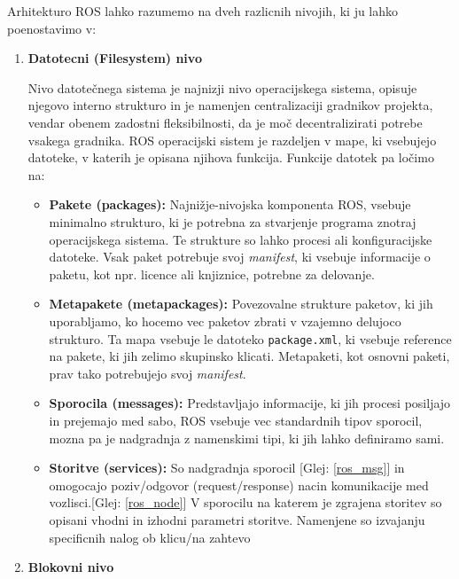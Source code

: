 \documentclass[a4paper,twoside,openright,12pt,slovene]{book}
\begin{document}
Arhitekturo ROS \cite{ROS_arhitektura} lahko razumemo na dveh razlicnih nivojih, ki ju lahko poenostavimo v:
\begin{enumerate}
    \item  \label{file_lvl} \textbf{Datotecni (Filesystem) nivo} 
    
    Nivo datotečnega sistema je najnizji nivo operacijskega sistema, opisuje njegovo interno strukturo in je namenjen centralizaciji gradnikov projekta, vendar obenem zadostni fleksibilnosti, da je moč decentralizirati potrebe vsakega gradnika. ROS operacijski sistem je razdeljen v mape, ki vsebujejo datoteke, v katerih je opisana njihova funkcija. Funkcije datotek pa ločimo na:
        \begin{itemize}
            \item \textbf{Pakete (packages):} Najnižje-nivojska komponenta ROS, vsebuje minimalno strukturo, ki je potrebna za stvarjenje programa znotraj operacijskega sistema. Te strukture so lahko procesi ali konfiguracijske datoteke. Vsak paket potrebuje svoj \textit{manifest}, ki vsebuje informacije o paketu, kot npr. licence ali knjiznice, potrebne za delovanje.

            \item \textbf{Metapakete (metapackages):} Povezovalne strukture paketov, ki jih uporabljamo, ko hocemo vec paketov zbrati v vzajemno delujoco strukturo. Ta mapa vsebuje le datoteko \verb|package.xml|, ki vsebuje reference na pakete, ki jih zelimo skupinsko klicati. Metapaketi, kot osnovni paketi, prav tako potrebujejo svoj \textit{manifest}.

            \item \label{ros_msg} \textbf{Sporocila (messages):} Predstavljajo informacije, ki jih procesi posiljajo in prejemajo med sabo, ROS vsebuje vec standardnih tipov sporocil, mozna pa je nadgradnja z namenskimi tipi, ki jih lahko definiramo sami.

            \item \textbf{Storitve (services):} So nadgradnja sporocil [Glej: \ref{ros_msg}] in omogocajo poziv/odgovor (request/response) nacin komunikacije med vozlisci.[Glej: \ref{ros_node}] V sporocilu na katerem je zgrajena storitev so opisani vhodni in izhodni parametri storitve. Namenjene so izvajanju specificnih nalog ob klicu/na zahtevo
        \end{itemize}

 \item \label{block_lvl} \textbf{Blokovni nivo} 
 

\end{enumerate}
\end{document}
